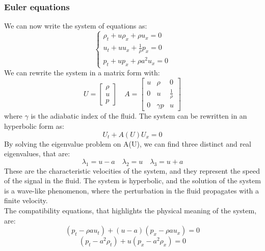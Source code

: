\documentclass{report}
\begin{document}
\subsubsection*{Euler equations}
We can now write the system of equations as:
\begin{equation*}
    \begin{cases}
        \rho_t + u\rho_x + \rho u_x = 0     \\
        u_t + u u_x + \frac{1}{\rho}p_x = 0 \\
        p_t + u p_x + \rho a^2  u_x = 0
    \end{cases}
\end{equation*}
We can rewrite the system in a matrix form with:
\begin{equation*}
    U =
    \begin{bmatrix}
        \rho \\
        u    \\
        p
    \end{bmatrix}
    \quad
    A =
    \begin{bmatrix}
        u & \rho     & 0              \\
        0 & u        & \frac{1}{\rho} \\
        0 & \gamma p & u
    \end{bmatrix}
\end{equation*}
where $\gamma$ is the adiabatic index of the fluid. The system can be rewritten in an hyperbolic form as:
\begin{equation*}
    U_t + A(U)U_x = 0
\end{equation*}
By solving the eigenvalue problem on A(U), we can find three distinct and real eigenvalues, that are:
\begin{equation*}
    \lambda_1 = u - a \quad \lambda_2 = u \quad \lambda_3 = u + a
\end{equation*}
These are the characteristic velocities of the system, and they represent the speed of the signal in the fluid. The system is hyperbolic, and the solution of the system is a wave-like phenomenon, where the perturbation in the fluid propagates with a finite velocity.
\\
The compatibility equations, that highlights the physical meaning of the system, are:
\begin{equation*}
 (p_t - \rho a u_t) + (u - a) (p_x - \rho a u_x) = 0
\end{equation*}
\begin{equation*}
    (p_t - a^2 \rho_t) + u (p_x - a^2 \rho_x) = 0
\end{equation*}
\end{document}
